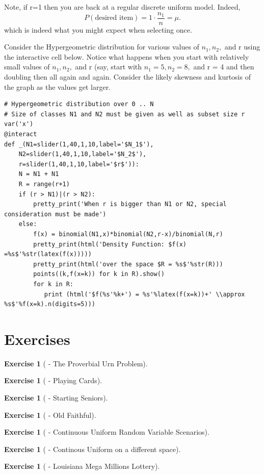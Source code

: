 \documentclass[10pt,]{book}
\theoremstyle{plain}
\theoremstyle{definition}
\theoremstyle{definition}
\theoremstyle{definition}
\newtheorem{exercise}[theorem]{Exercise}
\numberwithin{equation}{section}
\begin{document}
	Note, if r=1 then you are back at a regular discrete uniform model. Indeed, \begin{equation*}P(\text{desired item}) = 1 \cdot \frac{n_1}{n} = \mu .\end{equation*}
	which is indeed what you might expect when selecting once.
\par
Consider the Hypergeometric distribution for various values of \(n_1, n_2,\) and r using the interactive cell below. Notice what happens when you start with relatively small values of \(n_1, n_2,\) and r (say, start with \(n_1 = 5, n_2 = 8,\) and r = 4 and then doubling then all again and again. Consider the likely skewness and kurtosis of the graph as the values get larger.
%
\begin{lstlisting}[style=sageinput]
# Hypergeometric distribution over 0 .. N
# Size of classes N1 and N2 must be given as well as subset size r
var('x')
@interact
def _(N1=slider(1,40,1,10,label='$N_1$'),
    N2=slider(1,40,1,10,label='$N_2$'),
    r=slider(1,40,1,10,label='$r$')):
    N = N1 + N1
    R = range(r+1)
    if (r > N1)|(r > N2):
        pretty_print('When r is bigger than N1 or N2, special consideration must be made')
    else:
        f(x) = binomial(N1,x)*binomial(N2,r-x)/binomial(N,r)
        pretty_print(html('Density Function: $f(x) =%s$'%str(latex(f(x)))))
        pretty_print(html('over the space $R = %s$'%str(R)))
        points((k,f(x=k)) for k in R).show()
        for k in R:
           print (html('$f(%s'%k+') = %s'%latex(f(x=k))+' \\approx %s$'%f(x=k).n(digits=5)))
\end{lstlisting}
\typeout{************************************************}
\typeout{************************************************}
\section[{Exercises}]{Exercises}\label{section-32}
\begin{exercise}[{ - The Proverbial Urn Problem}]\label{exercise-6}
\end{exercise}
\begin{exercise}[{ - Playing Cards}]\label{exercise-7}
\end{exercise}
\begin{exercise}[{ - Starting Seniors}]\label{exercise-8}
\end{exercise}
\begin{exercise}[{ - Old Faithful}]\label{exercise-9}
\end{exercise}
\begin{exercise}[{ - Continuous Uniform Random Variable Scenarios}]\label{exercise-10}
\end{exercise}
\begin{exercise}[{ - Continous Uniform on a different space}]\label{exercise-11}
\end{exercise}
\begin{exercise}[{ - Louisiana Mega Millions Lottery}]\label{exercise-12}
\end{exercise}
\typeout{************************************************}
\typeout{************************************************}
\end{document}
